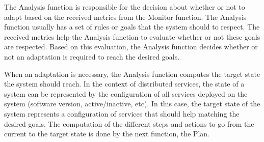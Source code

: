 \documentclass{article}
\begin{document}

The Analysis function is responsible for the decision about whether or not to adapt based on the received metrics from the Monitor function. The Analysis function usually has a set of rules or goals that the system should to respect. The received metrics help the Analysis function to evaluate whether or not these goals are respected. Based on this evaluation, the Analysis function decides whether or not an adaptation is required to reach the desired goals. 

When an adaptation is necessary, the Analysis function computes the target state the system should reach. In the context of distributed services, the state of a system can be represented by the configuration of all services deployed on the system (\eg software version, active/inactive, etc). In this case, the target state of the system represents a configuration of services that should help matching the desired goals. The computation of the different steps and actions to go from the current to the target state is done by the next function, the Plan.

\end{document}
